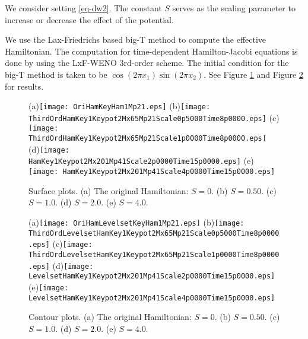 \documentclass[12pt,reqno]{amsart}
\theoremstyle{plain}
\theoremstyle{remark}
\numberwithin{equation}{section}
\begin{document}
\smallskip



  We consider setting \eqref{eq-dw2}.
 The constant $S$ serves as the scaling parameter to increase or decrease the effect of the potential. 

We use the Lax-Friedrichs based big-T method to compute the effective Hamiltonian. 
The computation for time-dependent Hamilton-Jacobi equations is done by using the LxF-WENO 3rd-order scheme. The initial condition for the big-T method is taken to be $\cos(2\pi x_1)\sin(2\pi x_2)$.  See Figure \ref{qtyEx1_2_weno3a}  and Figure \ref{qtyEx1_2_weno3b} for results. 

\begin{figure}[htb]
 \centering
 (a){\texttt{[image: OriHamKeyHam1Mp21.eps]}}
 (b){\texttt{[image: ThirdOrdHamKey1Keypot2Mx65Mp21Scale0p5000Time8p0000.eps]}}
 (c){\texttt{[image: ThirdOrdHamKey1Keypot2Mx65Mp21Scale1p0000Time8p0000.eps]}}
 (d){\texttt{[image: HamKey1Keypot2Mx201Mp41Scale2p0000Time15p0000.eps]}}
 (e){\texttt{[image: HamKey1Keypot2Mx201Mp41Scale4p0000Time15p0000.eps]}}
  \caption{Surface plots. (a) The original Hamiltonian: $S=0$. (b) $S=0.50$. (c)  $S=1.0$.  (d) $S=2.0$. (e)  $S=4.0$.}
\label{qtyEx1_2_weno3a}
\end{figure}

\begin{figure}[htb]
 \centering
 (a){\texttt{[image: OriHamLevelsetKeyHam1Mp21.eps]}}
 (b){\texttt{[image: ThirdOrdLevelsetHamKey1Keypot2Mx65Mp21Scale0p5000Time8p0000.eps]}}
 (c){\texttt{[image: ThirdOrdLevelsetHamKey1Keypot2Mx65Mp21Scale1p0000Time8p0000.eps]}}
 (d){\texttt{[image: LevelsetHamKey1Keypot2Mx201Mp41Scale2p0000Time15p0000.eps]}}
 (e){\texttt{[image: LevelsetHamKey1Keypot2Mx201Mp41Scale4p0000Time15p0000.eps]}} \caption{Contour plots. (a) The original Hamiltonian: $S=0$. (b) $S=0.50$. (c)  $S=1.0$. (d) $S=2.0$. (e)  $S=4.0$.}
\label{qtyEx1_2_weno3b}
\end{figure}



\medskip

%
\end{document}

